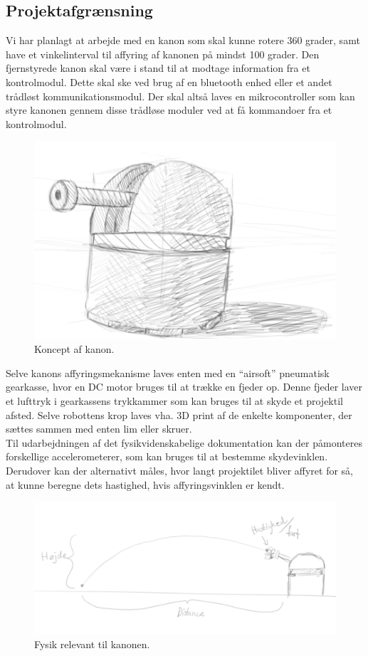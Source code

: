 \subsection{Projektafgrænsning}

Vi har planlagt at arbejde med en kanon som skal kunne rotere 360 grader, samt have et vinkelinterval til affyring af kanonen på mindst 100 grader. Den fjernstyrede kanon skal være i stand til at modtage information fra et kontrolmodul. Dette skal ske ved brug af en bluetooth enhed eller et andet trådløst kommunikationsmodul. Der skal altså laves en mikrocontroller som kan styre kanonen gennem disse trådløse moduler ved at få kommandoer fra et kontrolmodul.\\

\begin{figure}[H]
\centering
\includegraphics[scale=0.4]{Billeder/Koncept_turret.png}
\caption{Koncept af kanon.}
\label{fig:KonceptKanon}
\end{figure}

Selve kanons affyringsmekanisme laves enten med en “airsoft” pneumatisk gearkasse, hvor en DC motor bruges til at trække en fjeder op. Denne fjeder laver et lufttryk i gearkassens trykkammer som kan bruges til at skyde et projektil afsted. Selve robottens krop laves vha. 3D print af de enkelte komponenter, der sættes sammen med enten lim eller skruer. \\

Til udarbejdningen af det fysikvidenskabelige dokumentation kan der påmonteres forskellige accelerometerer, som kan bruges til at bestemme skydevinklen. Derudover kan der alternativt måles, hvor langt projektilet bliver affyret for så, at kunne beregne dets hastighed, hvis affyringsvinklen er kendt.

\begin{figure}[H]
\centering
\includegraphics[scale=0.4]{Billeder/Fysik_koncept.png}
\caption{Fysik relevant til kanonen.}
\label{fig:FysikKoncept}
\end{figure}